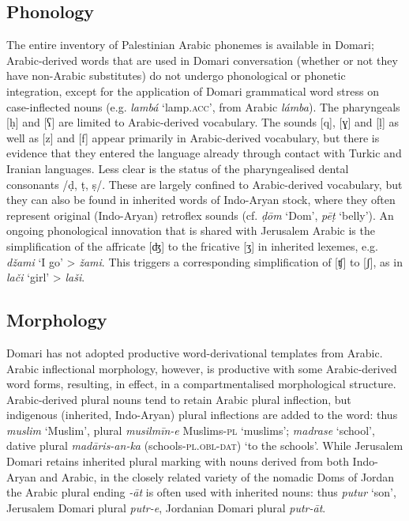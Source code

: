 \documentclass[output=paper]{langsci/langscibook}
\begin{document}
\subsection{Phonology
}

The entire inventory of Palestinian Arabic phonemes is available in Domari; Arabic-derived words that are used in Domari conversation (whether or not they have non-Arabic substitutes) do not undergo phonological or phonetic integration, except for the application of Domari grammatical word stress on case-inflected nouns (e.g. \textit{lambá} ‘lamp.\textsc{acc}’, from Arabic \textit{lámba}). The pharyngeals [ḥ] and [{ʕ}] are limited to Arabic-derived vocabulary. The sounds [q], [{ɣ}] and [ḷ] as well as [z] and [f] appear primarily in Arabic-derived vocabulary, but there is evidence that they entered the language already through contact with Turkic and Iranian languages. Less clear is the status of the pharyngealised dental consonants /ḍ, ṭ, ṣ/. These are largely confined to Arabic-derived vocabulary, but they can also be found in inherited words of Indo-Aryan stock, where they often represent original (Indo-Aryan) retroflex sounds (cf. \textit{ḍōm} ‘Dom’, \textit{pēṭ} ‘belly’). An ongoing phonological innovation that is shared with Jerusalem Arabic is the simplification of the affricate [{ʤ}] to the fricative [{ʒ}] in inherited lexemes, e.g. \textit{džami} ‘I go’ > \textit{žami}. This triggers a corresponding simplification of [{ʧ}] to [{ʃ}], as in \textit{lači} ‘girl’ > \textit{laši}.

\largerpage

\subsection{Morphology}

Domari has not adopted productive word-derivational templates from Arabic. Arabic inflectional morphology, however, is productive with some Arabic-derived word forms, resulting, in effect, in a compartmentalised morphological structure. Arabic-derived plural nouns tend to retain Arabic plural inflection, but indigenous (inherited, Indo-Aryan) plural inflections are added to the word: thus \textit{muslim} ‘Muslim’, plural \textit{musilmīn-e} Muslims-\textsc{pl} \textsc{‘}muslims’; \textit{madrase} ‘school’, dative plural \textit{madāris-an-ka}  (schools-\textsc{pl.obl-dat}) ‘to the schools’. While Jerusalem Domari retains inherited plural marking with nouns derived from both Indo-Aryan and Arabic, in the closely related variety of the nomadic Doms of Jordan the Arabic plural ending \textit{-āt} is often used with inherited nouns: thus \textit{putur} ‘son’, Jerusalem Domari plural \textit{putr-e}, Jordanian Domari plural \textit{putr-āt}.
\end{document}
